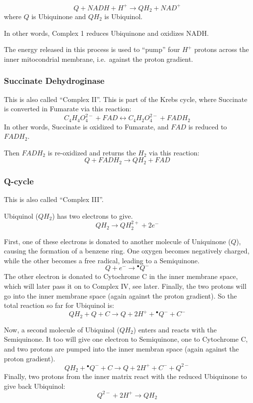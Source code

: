 \documentclass{article}
\begin{document}
\[
    Q + NADH + H^+ \rightarrow QH_2 + NAD^+
\]
where $Q$ is Ubiquinone and $QH_2$ is Ubiquinol.

In other words, Complex 1 reduces Ubiquinone and oxidizes NADH\@.

The energy released in this process is used to ``pump'' four $H^+$ protons across the
inner mitocondrial membrane, i.e.\ against the proton gradient.

\subsubsection{Succinate Dehydroginase}
This is also called ``Complex II''. This is part of the Krebs cycle, where
Succinate is converted in Fumarate via this reaction:
\[
    C_4H_4O_4^{2-} + FAD \leftrightarrow C_4H_2O_4^{2-} + FADH_2
\]
In other words, Succinate is oxidized to Fumarate, and $FAD$ is reduced to $FADH_2$.

Then $FADH_2$ is re-oxidized and returns the $H_2$ via this reaction:
\[
    Q + FADH_2 \rightarrow QH_2 + FAD
\]

\subsubsection{Q-cycle}
This is also called ``Complex III''.

Ubiquinol ($QH_2$) has two electrons to give.
\[
    QH_2 \rightarrow QH_2^{2+} + 2e^-
\]

First, one of these electrons is donated to another molecule of Uniquinone ($Q$), causing the
formation of a benzene ring.  One oxygen becomes negatively charged, while the other
becomes a free radical, leading to a Semiquinone.
\[
    Q + e^- \rightarrow {}^{\bullet}Q^{-}
\]
The other electron is donated to Cytochrome C in the inner membrane space, which will later
pass it on to Complex IV, see later. Finally, the two protons will go into the inner
membrane space (again against the proton gradient). So the total reaction so far for
Ubiquinol is:
\[
    QH_2 + Q + C \rightarrow Q + 2H^+ + {}^{\bullet}Q^{-} + C^-
\]

Now, a second molecule of Ubiquinol ($QH_2$) enters and reacts with the Semiquinone.
It too will give one electron to Semiquinone, one to Cytochrome C, and two protons
are pumped into the inner membran space (again against the proton gradient).
\[
    QH_2 + {}^{\bullet}Q^{-} + C \rightarrow Q + 2H^+ + C^- + Q^{2-}
\]
Finally, two protons from the inner matrix react with the reduced Ubiquinone to give back
Ubiquinol:
\[
    Q^{2-} + 2H^+ \rightarrow QH_2
\]
\end{document}
